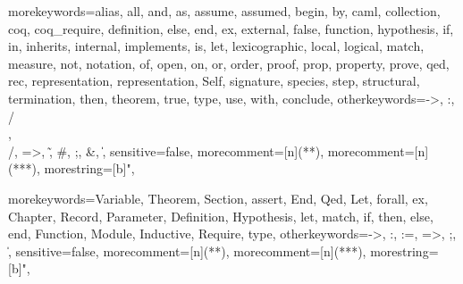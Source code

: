 \newcommand{\ocaml}{{\sf OCaml}}
\newcommand{\moca}{{\sf Moca}}
\newcommand{\focal}{{\sf FoCaL}}
\newcommand{\coq}{{\sf Coq}}
\newcommand{\cime}{{\sf CiME}}
\newcommand{\latex}{{\sf LaTeX}}
\newcommand{\zenon}{{\sf Zenon}}
\newcommand{\ocamldoc}{{\sf ocamldoc}}
\newcommand{\ocamlyacc}{{\sf ocamlyacc}}
\newcommand{\ocamllex}{{\sf ocamllex}}
\newcommand{\gcc}{{\sf gcc}}
\newcommand{\focdoc}{\textsc{focdoc}}
\newcommand{\focalize}{{\sf FoCaLize}}
\newcommand{\focalizedoc}{{\sf FoCaLizeDoc}}
\newcommand{\focalizec}{{\sf focalizec}}
\newcommand{\focalizedep}{{\sf focalizedep}}
\newcommand{\decldeps}[1] {\lbag\ #1\rbag}
\newcommand{\defdeps}[1]
  {\lbag\hspace{-0.2cm}\lbag\ #1\rbag\hspace{-0.2cm}\rbag}

  {morekeywords={alias, all, and, as, assume, assumed, begin, by, caml,
      collection, coq, coq_require, definition, else, end,
      ex, external, false, function, hypothesis, if, in,
      inherits, internal, implements, is, let, lexicographic,
      local, logical, match, measure, not, notation, of, open,
      on, or, order, proof, prop, property, prove, qed, rec,
      representation, representation, Self, signature, species, step,
      structural, termination, then, theorem, true, type, use,
      with, conclude},
    otherkeywords={->, :, /\\, \\/, =>, \~, \#, ;, \&, \|},
    sensitive=false,
    morecomment=[n]{(*}{*)},  %
    morecomment=[n]{(**}{*)},  %
    morestring=[b]",
  }

\newcommand{\setlangfocalize}{
\lstset{
  language=Focal, tabsize=2, frame=single, breaklines=true,
  basicstyle=\ttfamily, framexleftmargin=1mm, xleftmargin=1mm
}
}
\setlangfocalize


  {morekeywords={Variable, Theorem, Section, assert, End, Qed, Let,
      forall, ex, Chapter, Record, Parameter, Definition, Hypothesis,
      let, match, if, then, else, end, Function, Module, Inductive,
      Require, type},
    otherkeywords={->, :, :=, =>, ;, \|},
    sensitive=false,
    morecomment=[n]{(*}{*)},   %
    morecomment=[n]{(**}{*)},  %
    morestring=[b]",
  }

